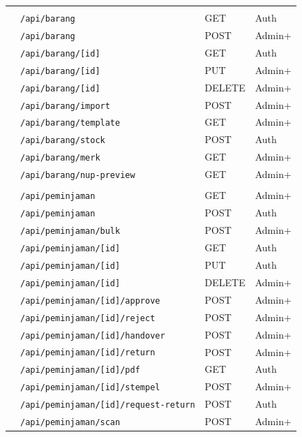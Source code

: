 \documentclass[
  12pt,
  a4paper,
  oneside,
  final
]{report}
\begin{document}
\begin{longtable}[!htbp]{p{4cm} p{5cm} p{3cm} p{2.5cm}}
  \rowcolor{lightblue}\multicolumn{4}{l}{\textbf{Barang}} \\[4pt]
                   & \texttt{/api/barang}             & GET    & Auth \\
                   & \texttt{/api/barang}             & POST   & Admin+ \\
                   & \texttt{/api/barang/[id]}        & GET    & Auth \\
                   & \texttt{/api/barang/[id]}        & PUT    & Admin+ \\
                   & \texttt{/api/barang/[id]}        & DELETE & Admin+ \\
                   & \texttt{/api/barang/import}      & POST   & Admin+ \\
                   & \texttt{/api/barang/template}    & GET    & Admin+ \\
                   & \texttt{/api/barang/stock}      & POST   & Auth \\
                   & \texttt{/api/barang/merk}       & GET    & Admin+ \\
                   & \texttt{/api/barang/nup-preview} & GET    & Admin+ \\

  \rowcolor{lightblue}\multicolumn{4}{l}{\textbf{Peminjaman}} \\[4pt]
                   & \texttt{/api/peminjaman}        & GET    & Admin+ \\
                   & \texttt{/api/peminjaman}         & POST   & Auth \\
                   & \texttt{/api/peminjaman/bulk}    & POST   & Admin+ \\
                   & \texttt{/api/peminjaman/[id]}    & GET    & Auth \\
                   & \texttt{/api/peminjaman/[id]}    & PUT    & Auth \\
                   & \texttt{/api/peminjaman/[id]}    & DELETE & Admin+ \\
                   & \texttt{/api/peminjaman/[id]/approve}    & POST & Admin+ \\
                   & \texttt{/api/peminjaman/[id]/reject}     & POST & Admin+ \\
                   & \texttt{/api/peminjaman/[id]/handover}   & POST & Admin+ \\
                   & \texttt{/api/peminjaman/[id]/return}     & POST & Admin+ \\
                   & \texttt{/api/peminjaman/[id]/pdf}        & GET  & Auth \\
                   & \texttt{/api/peminjaman/[id]/stempel}    & POST & Admin+ \\
                   & \texttt{/api/peminjaman/[id]/request-return} & POST & Auth \\
                   & \texttt{/api/peminjaman/scan}             & POST & Admin+ \\


\end{longtable}
\end{document}

